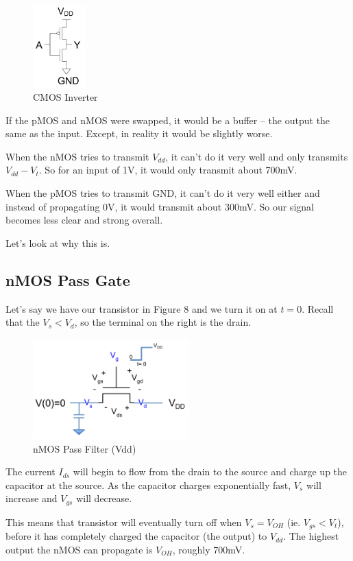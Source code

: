 \documentclass{article}
\begin{document}
\begin{figure}[ht!]
\centering
\includegraphics[width=20mm]{Inverter.png}
\caption{CMOS Inverter}
\end{figure}

If the pMOS and nMOS were swapped, it would be a buffer -- the output the same as the input. Except, in reality it would be slightly worse.

When the nMOS tries to transmit $V_{dd}$, it can't do it very well and only transmits $V_{dd} - V_{t}$. So for an input of 1V, it would only transmit about 700mV. 

When the pMOS tries to transmit GND, it can't do it very well either and instead of propagating 0V, it would transmit about 300mV. So our signal becomes less clear and strong overall.

Let's look at why this is. 

\subsection{nMOS Pass Gate}

Let's say we have our transistor in Figure 8 and we turn it on at $t=0$. Recall that the $V_s < V_d$, so the terminal on the right is the drain.  

\begin{figure}[ht!]
\centering
\includegraphics[width=60mm]{nPass.png}
\caption{nMOS Pass Filter (Vdd)}
\end{figure}

The current $I_{ds}$ will begin to flow from the drain to the source and charge up the capacitor at the source. As the capacitor charges exponentially fast, $V_{s}$ will increase and $V_{gs}$ will decrease. 

This means that transistor will eventually turn off when $V_s = V_{OH}$ (ie. $V_{gs} < V_t$), before it has completely charged the capacitor (the output) to $V_{dd}$. The highest output the nMOS can propagate is $V_{OH}$, roughly 700mV.
\end{document}
